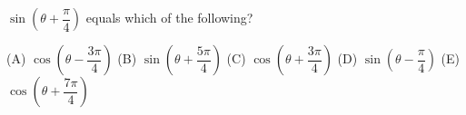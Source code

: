 $\sin\left(\theta+\dfrac{\pi}{4}\right)$ equals which of the following?

(A) $\cos\left(\theta-\dfrac{3\pi}{4}\right)$ \quad (B) $\sin\left(\theta+\dfrac{5\pi}{4}\right)$ \quad (C) $\cos\left(\theta+\dfrac{3\pi}{4}\right)$ \quad (D) $\sin\left(\theta-\dfrac{\pi}{4}\right)$ \quad (E) $\cos\left(\theta+\dfrac{7\pi}{4}\right)$
